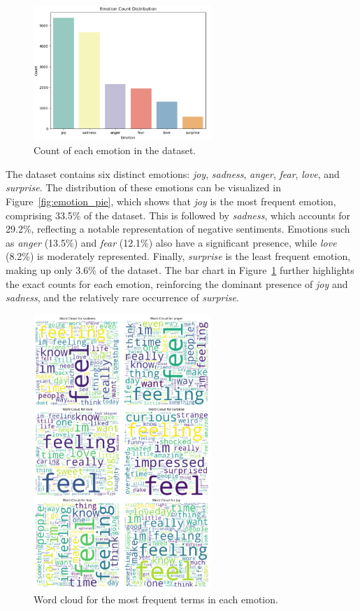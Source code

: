 \begin{figure}[H]
    \centering
    \includegraphics[width=0.6\textwidth]{images/emotion_bar.png}
    \caption{Count of each emotion in the dataset.}
    \label{fig:emotion_bar}
\end{figure}
The dataset contains six distinct emotions: \textit{joy}, \textit{sadness}, \textit{anger}, \textit{fear}, \textit{love}, and \textit{surprise}. The distribution of these emotions can be visualized in Figure~\ref{fig:emotion_pie}, which shows that \textit{joy} is the most frequent emotion, comprising 33.5\% of the dataset. This is followed by \textit{sadness}, which accounts for 29.2\%, reflecting a notable representation of negative sentiments. Emotions such as \textit{anger} (13.5\%) and \textit{fear} (12.1\%) also have a significant presence, while \textit{love} (8.2\%) is moderately represented. Finally, \textit{surprise} is the least frequent emotion, making up only 3.6\% of the dataset. The bar chart in Figure~\ref{fig:emotion_bar} further highlights the exact counts for each emotion, reinforcing the dominant presence of \textit{joy} and \textit{sadness}, and the relatively rare occurrence of \textit{surprise}.

\begin{figure}[H]
    \centering
    \includegraphics[width=0.6\textwidth]{images/emotion_cloud.png}
    \caption{Word cloud for the most frequent terms in each emotion.}
    \label{fig:emotion_cloud}
\end{figure}


